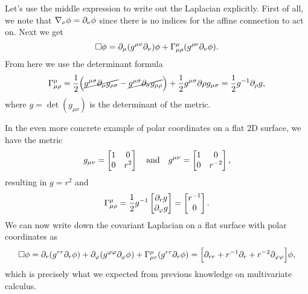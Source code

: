 \documentclass[11pt,a4paper, 
swedish, english %
]{article}
\begin{document}
Let's use the middle expression to write out the Laplacian
explicitly. First of all, we note that $\nabla_\nu\phi=\partial_\nu\phi$
since there is no indices for the affine connection to act on. Next
we get
\begin{equation}
\Box\phi=\partial_\mu(g^{\mu\nu}\partial_\nu)\phi
+\Gamma^\mu_{\mu\rho}(g^{\rho\nu}\partial_{\nu}\phi).
\end{equation}
From here we use the determinant formula
\begin{equation}\label{eq:det-formula}
\Gamma^\mu_{\mu\rho}=\frac{1}{2}
\Big(\cancel{g^{\mu\sigma}\partial_\mu g_{\rho\sigma}}
-\cancel{g^{\mu\sigma}\partial_\sigma g_{\mu\rho}} \Big)
+\frac{1}{2}g^{\mu\sigma}\partial\rho g_{\mu\sigma}
=\frac{1}{2}g^{-1}\partial_\rho g,
\end{equation}
where $g=\det(g_{\mu\nu})$ is the determinant of the metric.

In the even more concrete example of polar coordinates on a flat 2D
surface, we have the metric
\begin{equation}
g_{\mu\nu}=
\begin{bmatrix}
1&0\\
0&r^2
\end{bmatrix}
\qand
g^{\mu\nu}=
\begin{bmatrix}
1&0\\
0&r^{-2}
\end{bmatrix},
\end{equation}
resulting in $g=r^2$ and
\begin{equation}
\Gamma^\mu_{\mu\rho}=\frac{1}{2}g^{-1}
\begin{bmatrix}
\partial_r g\\\partial_\varphi g
\end{bmatrix}
=
\begin{bmatrix}
r^{-1}\\0
\end{bmatrix}.
\end{equation}
We can now write down the covariant Laplacian on a flat surface with
polar coordinates as
\begin{equation}
\Box\phi=\partial_r(g^{rr}\partial_r\phi)
+\partial_\varphi(g^{\varphi\varphi}\partial_\varphi\phi)
+\Gamma^{\mu}_{\mu r}(g^{rr}\partial_r\phi)
=\Big[\partial_{rr}+r^{-1}\partial_r+r^{-2}\partial_{\varphi\varphi}
\Big]\phi,
\end{equation}
which is precisely what we expected from previous knowledge on
multivariate calculus. 
\end{document}
